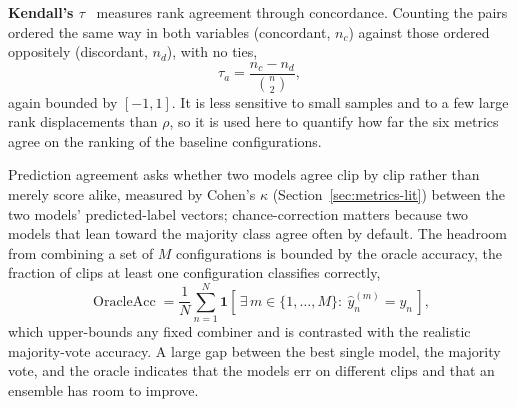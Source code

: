 \documentclass[../main.tex]{subfiles}
\begin{document}
\textbf{Kendall's $\tau$}~\cite{kendall} measures rank agreement through concordance. Counting the pairs ordered the same way in both variables (concordant, $n_c$) against those ordered oppositely (discordant, $n_d$), with no ties,
\begin{equation}
\tau_a = \frac{n_c - n_d}{\binom{n}{2}},
\end{equation}
again bounded by $[-1,1]$. It is less sensitive to small samples and to a few large rank displacements than $\rho$, so it is used here to quantify how far the six metrics agree on the ranking of the baseline configurations.

Prediction agreement asks whether two models agree clip by clip rather than merely score alike, measured by Cohen's $\kappa$ (Section~\ref{sec:metrics-lit}) between the two models' predicted-label vectors; chance-correction matters because two models that lean toward the majority class agree often by default. The headroom from combining a set of $M$ configurations is bounded by the oracle accuracy, the fraction of clips at least one configuration classifies correctly,
\begin{equation}
\operatorname{OracleAcc} = \frac{1}{N}\sum_{n=1}^{N} \mathbf{1}\!\left[\,\exists\, m\in\{1,\dots,M\}:\ \widehat{y}^{(m)}_n = y_n\,\right],
\end{equation}
which upper-bounds any fixed combiner and is contrasted with the realistic majority-vote accuracy. A large gap between the best single model, the majority vote, and the oracle indicates that the models err on different clips and that an ensemble has room to improve.
\end{document}
